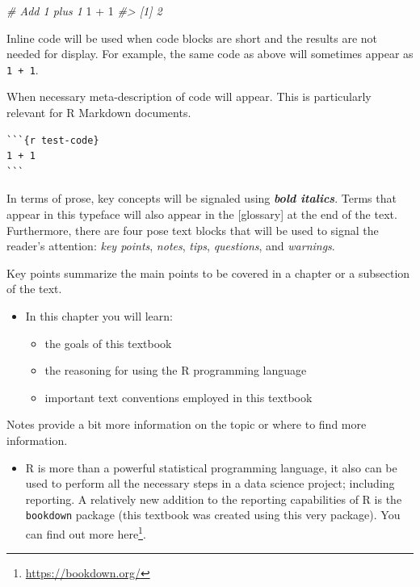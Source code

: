 \documentclass[
]{article}
\newenvironment{Shaded}{\begin{snugshade}}{\end{snugshade}}
\newcommand{\CommentTok}[1]{\textcolor[rgb]{0.56,0.35,0.01}{\textit{#1}}}
\newcommand{\DecValTok}[1]{\textcolor[rgb]{0.00,0.00,0.81}{#1}}
\newcommand{\SpecialCharTok}[1]{\textcolor[rgb]{0.00,0.00,0.00}{#1}}
\DeclareRobustCommand{\href}[2]{#2\footnote{\url{#1}}}
\providecommand{\tightlist}{%
  \setlength{\itemsep}{0pt}\setlength{\parskip}{0pt}}
\newenvironment{rmdblock}[1]
  {\begin{shaded*}
  \begin{itemize}
  \renewcommand{\labelitemi}{
    \raisebox{-.5\height}[0pt][0pt]{
      {\setkeys{Gin}{width=2em,keepaspectratio}\texttt{[image: assets/images/\#1]}}
    }
  }
  \item
  }
  {
  \end{itemize}
  \end{shaded*}
  }
\newenvironment{rmdkey}
  {\begin{rmdblock}{key}}
  {\end{rmdblock}}
\newenvironment{rmdnote}
  {\begin{rmdblock}{note}}
  {\end{rmdblock}}
\begin{document}
\begin{Shaded}
\begin{Highlighting}[]
\CommentTok{\# Add 1 plus 1}
\DecValTok{1} \SpecialCharTok{+} \DecValTok{1}
\CommentTok{\#\textgreater{} [1] 2}
\end{Highlighting}
\end{Shaded}

Inline code will be used when code blocks are short and the results are not needed for display. For example, the same code as above will sometimes appear as \texttt{1\ +\ 1}.

When necessary meta-description of code will appear. This is particularly relevant for R Markdown documents.

\begin{verbatim}
```{r test-code}
1 + 1
```
\end{verbatim}

In terms of prose, key concepts will be signaled using \textbf{\emph{bold italics}}. Terms that appear in this typeface will also appear in the {[}glossary{]} at the end of the text. Furthermore, there are four pose text blocks that will be used to signal the reader's attention: \emph{key points}, \emph{notes}, \emph{tips}, \emph{questions}, and \emph{warnings}.

Key points summarize the main points to be covered in a chapter or a subsection of the text.

\begin{rmdkey}
In this chapter you will learn:

\begin{itemize}
\tightlist
\item
  the goals of this textbook
\item
  the reasoning for using the R programming language
\item
  important text conventions employed in this textbook
\end{itemize}
\end{rmdkey}

Notes provide a bit more information on the topic or where to find more information.

\begin{rmdnote}
R is more than a powerful statistical programming language, it also can
be used to perform all the necessary steps in a data science project;
including reporting. A relatively new addition to the reporting
capabilities of R is the \texttt{bookdown} package (this textbook was
created using this very package). You can find out more
\href{https://bookdown.org/}{here}.
\end{rmdnote}
\end{document}

